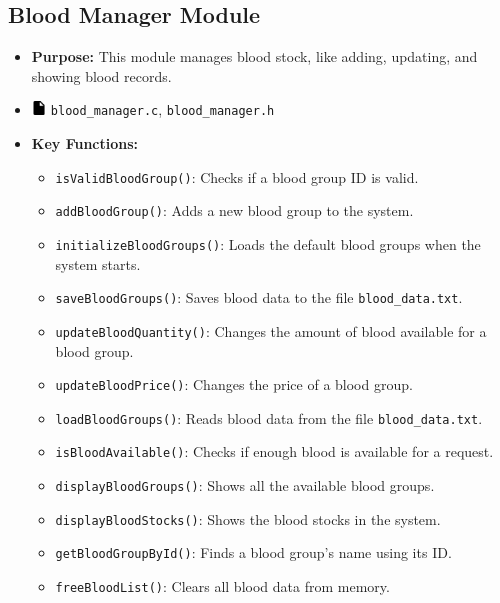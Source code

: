 \documentclass[12pt,a4paper]{report}
\begin{document}
\subsection{Blood Manager Module}
\begin{itemize}
    \item \normalsize \textbf{Purpose:} This module manages blood stock, like adding, updating, and showing blood records.
    \item \normalsize \includegraphics[width=0.03\textwidth]{../resources/assets/images/file_icon.png} \texttt{blood\_manager.c}, \texttt{blood\_manager.h}
    \item \normalsize \textbf{Key Functions:}
    \begin{itemize}
        \item \texttt{isValidBloodGroup()}: Checks if a blood group ID is valid.
        \item \texttt{addBloodGroup()}: Adds a new blood group to the system.
        \item \texttt{initializeBloodGroups()}: Loads the default blood groups when the system starts.
        \item \texttt{saveBloodGroups()}: Saves blood data to the file \texttt{blood\_data.txt}.
        \item \texttt{updateBloodQuantity()}: Changes the amount of blood available for a blood group.
        \item \texttt{updateBloodPrice()}: Changes the price of a blood group.
        \item \texttt{loadBloodGroups()}: Reads blood data from the file \texttt{blood\_data.txt}.
        \item \texttt{isBloodAvailable()}: Checks if enough blood is available for a request.
        \item \texttt{displayBloodGroups()}: Shows all the available blood groups.
        \item \texttt{displayBloodStocks()}: Shows the blood stocks in the system.
        \item \texttt{getBloodGroupById()}: Finds a blood group's name using its ID.\
        \item \texttt{freeBloodList()}: Clears all blood data from memory.
    \end{itemize}
\end{itemize}
\end{document}
